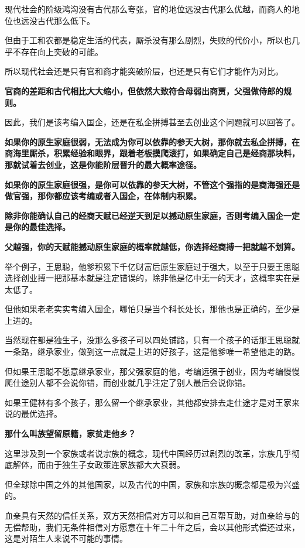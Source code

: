 \documentclass[UTF8, 11pt, oneside]{ctexart}
\newcommand{\zd}[1]{\textbf{\textcolor[RGB]{123,12,0}{#1}}} %
\begin{document}
现代社会的阶级鸿沟没有古代那么夸张，官的地位远没古代那么优越，而商人的地位也远没古代那么低下。

但由于工和农都是稳定生活的代表，厮杀没有那么剧烈，失败的代价小，所以也几乎不存在向上突破的可能。

所以现代社会还是只有官和商才能突破阶层，也还是只有它们才能作为对比。

\zd{官商的差距和古代相比大大缩小，但依然大致符合母弱出商贾，父强做侍郎的规则。}

因此，我们是该考编入国企，还是在私企拼搏甚至去创业这个问题就可以回答了。

\zd{如果你的原生家庭很弱，无法成为你可以依靠的参天大树，那你就去私企拼搏，在商海里厮杀，积累经验和眼界，跟着老板摸爬滚打，如果确定自己是经商那块料，那就试着去创业，这是你能阶层晋升的最大概率途径。}

\zd{如果你的原生家庭很强，是你可以依靠的参天大树，不管这个强指的是商海强还是做官强，那你都应该考编或者入国企，在体制内积累。}

\zd{除非你能确认自己的经商天赋已经逆天到足以撼动原生家庭，否则考编入国企一定是你的最佳选择。}

\zd{父越强，你的天赋能撼动原生家庭的概率就越低，你选择经商搏一把就越不划算。}

举个例子，王思聪，他爹积累下千亿财富后原生家庭过于强大，以至于只要王思聪选择创业搏一把那基本就是注定错误的，除非他是亿中无一的天才，这概率实在是太低了。

但他如果老老实实考编入国企，哪怕只是当个科长处长，那他也是正确的，至少是上进的。

当然现在都是独生子，没那么多孩子可以四处铺路，只有一个孩子的话那王思聪就一条路，继承家业，做到这一点就是上进的好孩子，这是他爹唯一希望他走的路。

但如果王思聪不愿意继承家业，那父强家庭的他，考编远强于创业，因为考编慢慢爬仕途别人都不会说你错，而创业就几乎注定了别人最后会说你错。

如果王健林有多个孩子，那么留一个继承家业，其他都安排去走仕途才是对王家来说的最优选择。

\zd{那什么叫族望留原籍，家贫走他乡？}

这里涉及到一个家族或者说宗族的概念，现代中国经历过剧烈的改革，宗族几乎彻底解体，而由于独生子女政策连家族都大大衰弱。

但全球除中国之外的其他国家，以及古代的中国，家族和宗族的概念都是极为兴盛的。

血亲具有天然的信任关系，双方天然相信对方可以和自己互帮互助，对血亲给与的无偿帮助，我们无条件相信对方愿意在十年二十年之后，会以其他形式偿还过来，这是对陌生人来说不可能的事情。
\end{document}
